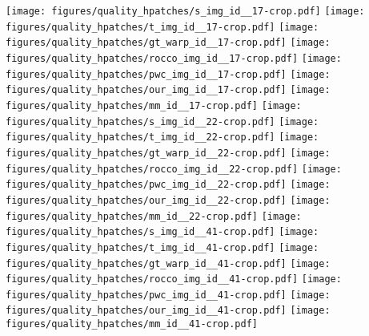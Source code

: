 \documentclass[10pt,twocolumn,letterpaper]{article}
\begin{document}
\begin{figure*}[t!]
	\centering
    \texttt{[image: figures/quality\_hpatches/s\_img\_id\_\_17-crop.pdf]}
    \texttt{[image: figures/quality\_hpatches/t\_img\_id\_\_17-crop.pdf]}
    \texttt{[image: figures/quality\_hpatches/gt\_warp\_id\_\_17-crop.pdf]}
    \texttt{[image: figures/quality\_hpatches/rocco\_img\_id\_\_17-crop.pdf]}
    \texttt{[image: figures/quality\_hpatches/pwc\_img\_id\_\_17-crop.pdf]}
    \texttt{[image: figures/quality\_hpatches/our\_img\_id\_\_17-crop.pdf]}
    \texttt{[image: figures/quality\_hpatches/mm\_id\_\_17-crop.pdf]}
    \vspace{0.5mm}
    \texttt{[image: figures/quality\_hpatches/s\_img\_id\_\_22-crop.pdf]}
    \texttt{[image: figures/quality\_hpatches/t\_img\_id\_\_22-crop.pdf]}
    \texttt{[image: figures/quality\_hpatches/gt\_warp\_id\_\_22-crop.pdf]}
    \texttt{[image: figures/quality\_hpatches/rocco\_img\_id\_\_22-crop.pdf]}
    \texttt{[image: figures/quality\_hpatches/pwc\_img\_id\_\_22-crop.pdf]}
    \texttt{[image: figures/quality\_hpatches/our\_img\_id\_\_22-crop.pdf]}
    \texttt{[image: figures/quality\_hpatches/mm\_id\_\_22-crop.pdf]}
    \vspace{0.5mm}
    \texttt{[image: figures/quality\_hpatches/s\_img\_id\_\_41-crop.pdf]}
    \texttt{[image: figures/quality\_hpatches/t\_img\_id\_\_41-crop.pdf]}
    \texttt{[image: figures/quality\_hpatches/gt\_warp\_id\_\_41-crop.pdf]}
    \texttt{[image: figures/quality\_hpatches/rocco\_img\_id\_\_41-crop.pdf]}
    \texttt{[image: figures/quality\_hpatches/pwc\_img\_id\_\_41-crop.pdf]}
    \texttt{[image: figures/quality\_hpatches/our\_img\_id\_\_41-crop.pdf]}
    \texttt{[image: figures/quality\_hpatches/mm\_id\_\_41-crop.pdf]}

\end{figure*}
\end{document}
